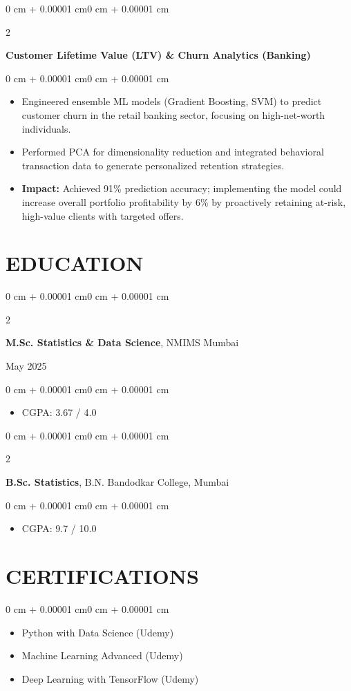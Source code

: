 \documentclass[9.5pt, letterpaper]{article}
\newenvironment{highlights}{
    \begin{itemize}[
        topsep=0pt,
        parsep=0pt,
        partopsep=0pt,
        itemsep=0pt,
        leftmargin=0 cm + 8pt
    ]
}{
    \end{itemize}
}
\newenvironment{onecolentry}{
    \begin{adjustwidth}{0 cm + 0.00001 cm}{0 cm + 0.00001 cm}
}{
    \end{adjustwidth}
}
\newenvironment{twocolentry}[2][]{
    \onecolentry
    \def\secondColumn{#2}
    \setcolumnwidth{\fill, 3.5 cm}
    \begin{paracol}{2}
}{
    \switchcolumn \raggedleft \secondColumn
    \end{paracol}
    \endonecolentry
}
\begin{document}
    \vspace{0.01 cm}

    \begin{twocolentry}{2024}
        \textbf{Customer Lifetime Value (LTV) \& Churn Analytics (Banking)}
    \end{twocolentry}
    \vspace{0.01 cm}
    \begin{onecolentry}
        \begin{highlights}
            \item Engineered ensemble ML models (Gradient Boosting, SVM) to predict customer churn in the retail banking sector, focusing on high-net-worth individuals.
            \item Performed PCA for dimensionality reduction and integrated behavioral transaction data to generate personalized retention strategies.
            \item \textbf{Impact:} Achieved 91\% prediction accuracy; implementing the model could increase overall portfolio profitability by 6\% by proactively retaining at-risk, high-value clients with targeted offers.
        \end{highlights}
    \end{onecolentry}

    \section{EDUCATION}
    \begin{twocolentry}{May 2025}
        \textbf{M.Sc. Statistics \& Data Science}, NMIMS Mumbai
    \end{twocolentry}
    \vspace{0.01 cm}
    \begin{onecolentry}
        \begin{highlights}
            \item CGPA: 3.67 / 4.0
        \end{highlights}
    \end{onecolentry}
    \vspace{0.01 cm}
    \begin{twocolentry}{2023}
        \textbf{B.Sc. Statistics}, B.N. Bandodkar College, Mumbai
    \end{twocolentry}
    \vspace{0.01 cm}
    \begin{onecolentry}
        \begin{highlights}
            \item CGPA: 9.7 / 10.0
        \end{highlights}
    \end{onecolentry}

    \section{CERTIFICATIONS}
    \begin{onecolentry}
        \begin{highlights}
            \item Python with Data Science (Udemy)
            \item Machine Learning Advanced (Udemy)
            \item Deep Learning with TensorFlow (Udemy)
        \end{highlights}
    \end{onecolentry}
\end{document}
